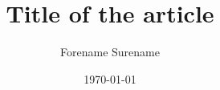 \documentclass[11pt, a4paper]{article}
\title{Title of the article}
\author{Forename Surename}
\date{\today}
\begin{document}
	




{} 

\end{document}
